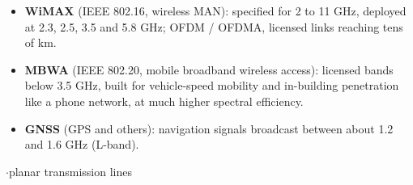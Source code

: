 \par{}
\begin{itemize}
  \item \textbf{WiMAX} (IEEE 802.16, wireless MAN): specified for 2 to 11 GHz, deployed at
    2.3, 2.5, 3.5 and 5.8 GHz; OFDM / OFDMA, licensed links reaching tens of km.
  \item \textbf{MBWA} (IEEE 802.20, mobile broadband wireless access): licensed bands below
    3.5 GHz, built for vehicle-speed mobility and in-building penetration like a phone
    network, at much higher spectral efficiency.
  \item \textbf{GNSS} (GPS and others): navigation signals broadcast between about 1.2 and
    1.6 GHz (L-band).
\end{itemize}

\vspace{2pt}


{\color{sub}\footnotesize {}  \gap$\cdot$\gap planar transmission lines}

